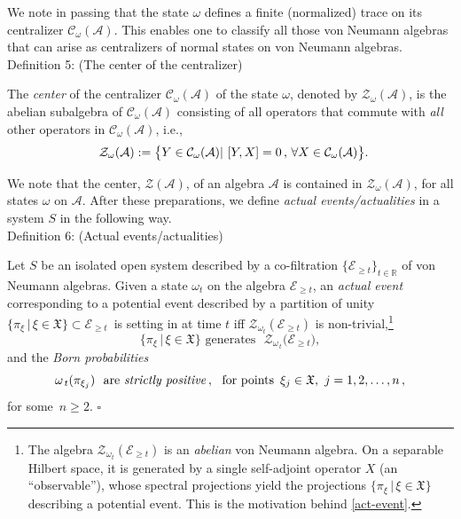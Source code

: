 \documentclass[12pt]{article}
\begin{document}
We note in passing that the state $\omega$ defines a finite (normalized) trace on its centralizer
$\mathcal{C}_{\omega}(\mathcal{A})$. This enables one to classify all those von Neumann algebras that can arise as
centralizers of normal states on von Neumann algebras.\\

{Definition 5}: (The center of the centralizer)

The \textit{center} of the centralizer $\mathcal{C}_{\omega}(\mathcal{A})$ of the state $\omega$, denoted by
$\mathcal{Z}_{\omega}(\mathcal{A})$, is the abelian subalgebra of $\mathcal{C}_{\omega}(\mathcal{A})$ consisting
of all operators that commute with \textit{all} other operators in
$\mathcal{C}_{\omega}(\mathcal{A})$, i.e.,
$$
\hspace{2.5cm}\mathcal{Z}_{\omega}(\mathcal{A}):= \big\{ Y \in \mathcal{C}_{\omega}(\mathcal{A})| \,\,[Y,X]=0\,,\, \forall X \in
\mathcal{C}_{\omega}(\mathcal{A}) \big\}. \hspace{2.3cm} \square
$$

 We note that the center, $\mathcal{Z}(\mathcal{A})$, of an algebra $\mathcal{A}$ is contained in
 $\mathcal{Z}_{\omega}(\mathcal{A})$, for all states $\omega$ on $\mathcal{A}$. After these preparations,
 we define \textit{actual events/actualities} in a system $S$ in the following way.\\

 {Definition 6}: (Actual events/actualities) \label{ETHevent}

Let $S$ be an isolated open system described by a co-filtration $\big\{ \mathcal{E}_{\geq t} \big\}_{t \in \mathbb{R}}$ of von
Neumann algebras. Given a state $\omega_t$ on the algebra $\mathcal{E}_{\geq t}$, an \textit{actual event} corresponding
to a potential event described  by a partition of unity
$\big\{ \pi_{\xi}\,\vert\, \xi \in \mathfrak{X} \big\} \subset \mathcal{E}_{\geq t}$\, is setting in
 at time $t$ iff $\mathcal{Z}_{\omega_t}(\mathcal{E}_{\geq t})$ is non-trivial,\footnote{The
 algebra $\mathcal{Z}_{\omega_{t}}(\mathcal{E}_{\geq t})$ is an \textit{abelian} von Neumann algebra.
On a separable Hilbert space, it is generated by a single self-adjoint operator $X$ (an ``observable''),
whose spectral projections yield the projections $\lbrace \pi_{\xi}\,\vert \, \xi \in \mathfrak{X} \rbrace$
describing a potential event. This is the motivation behind \eqref{act-event}.}
\begin{equation}\label{act-event}
\big\{ \pi_{\xi}\,\vert \,\xi \in \mathfrak{X} \big\} \,\,\text{generates   }\,\, \mathcal{Z}_{\omega_{\,t}}\big(\mathcal{E}_{\geq t}\big),
\end{equation}
and the \textit{Born probabilities}
\begin{equation}\label{Born}
\omega_{\,t}(\pi_{\xi_{j}}) \,\,\text{ are \textit{strictly positive}}\,, \,\, \text{ for points }\,\xi_j \in \mathfrak{X}, \,\, j=1,2, \dots, n\,,
\end{equation}
for some~$n\geq 2$. \hspace{12cm}$\square$
\end{document}
